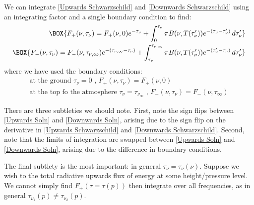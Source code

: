 We can integrate \ref{Upwards Schwarzschild} and \ref{Downwards Schwarzschild} using an integrating factor and a single boundary condition to find:
\begin{align}
    \BOX{F_+(\nu,\tau_\nu)=F_+(\nu,0)e^{-\tau_\nu}+\int_0^{\tau_\nu}\pi B(\nu,T(\tau_\nu'))e^{-(\tau_\nu-\tau_\nu')}\,d\tau_\nu'} \label{Upwards Soln}\\ 
    \BOX{F_-(\nu,\tau_\nu)=F_-(\nu,\tau_{\nu,\infty})e^{-(\tau_{\nu,\infty}-\tau_\nu)}+\int_{\tau_\nu}^{\tau_{\nu,\infty}}\pi B(\nu,T(\tau_\nu'))e^{-(\tau_\nu'-\tau_\nu)}\,d\tau_\nu'} \label{Downwards Soln}
\end{align}
where we have used the boundary conditions:
\begin{align*}
    \text{at the ground }\boxed{\tau_\nu=0\text{ , } F_+(\nu,\tau_\nu)=F_+(\nu,0)}\\
    \text{at the top fo the atmosphere }\boxed{\tau_\nu=\tau_{\nu_\infty}\text{ , } F_-(\nu,\tau_\nu)=F_-(\nu,\tau_{\infty})}
\end{align*}

There are three subtleties we should note. First, note the sign flips between \ref{Upwards Soln} and \ref{Downwards Soln}, arising due to the sign flip on the derivative in \ref{Upwards Schwarzschild} and \ref{Downwards Schwarzschild}. Second, note that the limits of integration are swapped between \ref{Upwards Soln} and \ref{Downwards Soln}, arising due to the difference in boundary conditions.

The final subtlety is the most important: in general $\tau_\nu=\tau_\nu(\nu)$. Suppose we wish to the total radiative upwards flux of energy at some height/pressure level. We cannot simply find $F_+(\tau=\tau(p))$ then integrate over all frequencies, as in general $\tau_{\nu_1}(p)\neq\tau_{\nu_2}(p)$.

